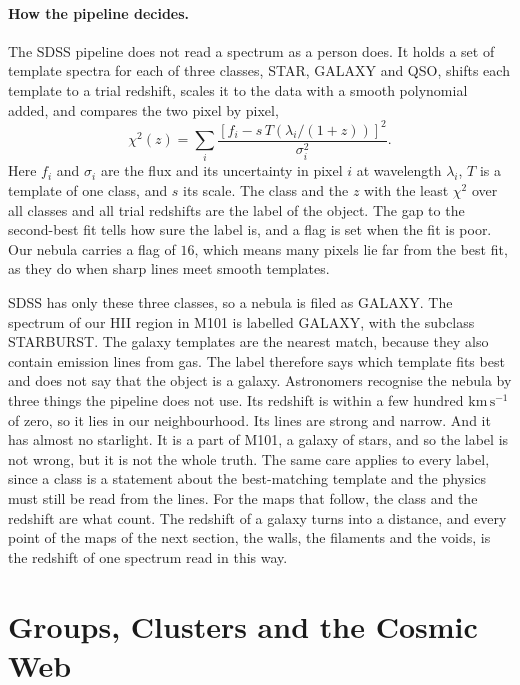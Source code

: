 \paragraph{How the pipeline decides.} The SDSS pipeline does not read a spectrum as a person does. It holds a set of template spectra for each of three classes, STAR, GALAXY and QSO, shifts each template to a trial redshift, scales it to the data with a smooth polynomial added, and compares the two pixel by pixel,
\begin{equation}
	\chi^2(z)=\sum_i\frac{\left[f_i-s\,T(\lambda_i/(1+z))\right]^2}{\sigma_i^2}.
	\label{ga:eq:chi2}
\end{equation}
Here $f_i$ and $\sigma_i$ are the flux and its uncertainty in pixel $i$ at wavelength $\lambda_i$, $T$ is a template of one class, and $s$ its scale. The class and the $z$ with the least $\chi^2$ over all classes and all trial redshifts are the label of the object. The gap to the second-best fit tells how sure the label is, and a flag is set when the fit is poor. Our nebula carries a flag of $16$, which means many pixels lie far from the best fit, as they do when sharp lines meet smooth templates.

SDSS has only these three classes, so a nebula is filed as GALAXY. The spectrum of our HII region in M101 is labelled GALAXY, with the subclass STARBURST. The galaxy templates are the nearest match, because they also contain emission lines from gas. The label therefore says which template fits best and does not say that the object is a galaxy. Astronomers recognise the nebula by three things the pipeline does not use. Its redshift is within a few hundred $\mathrm{km\,s^{-1}}$ of zero, so it lies in our neighbourhood. Its lines are strong and narrow. And it has almost no starlight. It is a part of M101, a galaxy of stars, and so the label is not wrong, but it is not the whole truth. The same care applies to every label, since a class is a statement about the best-matching template and the physics must still be read from the lines. For the maps that follow, the class and the redshift are what count. The redshift of a galaxy turns into a distance, and every point of the maps of the next section, the walls, the filaments and the voids, is the redshift of one spectrum read in this way.

\section{Groups, Clusters and the Cosmic Web}
\label{ga:sec:hierarchy}

